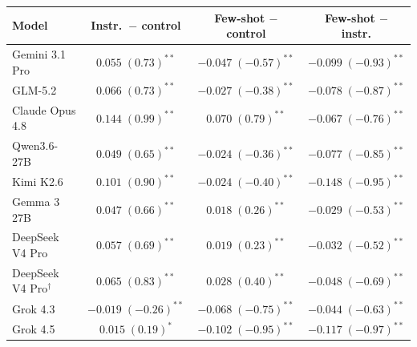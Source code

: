 \begin{tabular}{lccc}
\toprule
Model & Instr.\ $-$ control & Few-shot $-$ control & Few-shot $-$ instr. \\
\midrule
Gemini 3.1 Pro & $0.055\;(0.73)^{**}$ & $-0.047\;(-0.57)^{**}$ & $-0.099\;(-0.93)^{**}$ \\
GLM-5.2 & $0.066\;(0.73)^{**}$ & $-0.027\;(-0.38)^{**}$ & $-0.078\;(-0.87)^{**}$ \\
Claude Opus 4.8 & $0.144\;(0.99)^{**}$ & $0.070\;(0.79)^{**}$ & $-0.067\;(-0.76)^{**}$ \\
Qwen3.6-27B & $0.049\;(0.65)^{**}$ & $-0.024\;(-0.36)^{**}$ & $-0.077\;(-0.85)^{**}$ \\
Kimi K2.6 & $0.101\;(0.90)^{**}$ & $-0.024\;(-0.40)^{**}$ & $-0.148\;(-0.95)^{**}$ \\
Gemma 3 27B & $0.047\;(0.66)^{**}$ & $0.018\;(0.26)^{**}$ & $-0.029\;(-0.53)^{**}$ \\
DeepSeek V4 Pro & $0.057\;(0.69)^{**}$ & $0.019\;(0.23)^{**}$ & $-0.032\;(-0.52)^{**}$ \\
DeepSeek V4 Pro$^{\dagger}$ & $0.065\;(0.83)^{**}$ & $0.028\;(0.40)^{**}$ & $-0.048\;(-0.69)^{**}$ \\
Grok 4.3 & $-0.019\;(-0.26)^{**}$ & $-0.068\;(-0.75)^{**}$ & $-0.044\;(-0.63)^{**}$ \\
Grok 4.5 & $0.015\;(0.19)^{*}$ & $-0.102\;(-0.95)^{**}$ & $-0.117\;(-0.97)^{**}$ \\
\bottomrule
\end{tabular}
